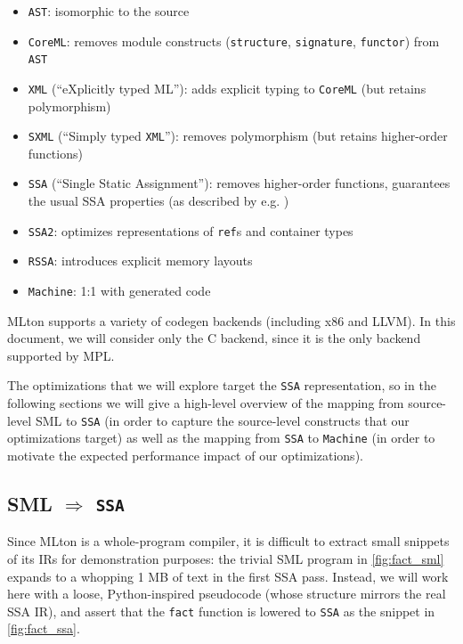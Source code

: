 \begin{itemize}
\item \texttt{AST}: isomorphic to the source
\item \texttt{CoreML}: removes module constructs (\texttt{structure}, \texttt{signature},
  \texttt{functor}) from \texttt{AST}
\item \texttt{XML} (``eXplicitly typed ML''): adds explicit typing to \texttt{CoreML} (but retains
  polymorphism)
\item \texttt{SXML} (``Simply typed \texttt{XML}''): removes polymorphism (but
  retains higher-order functions)
\item \texttt{SSA} (``Single Static Assignment''): removes higher-order functions,
  guarantees the usual SSA properties (as described by e.g. \citet{ssa-paper})
\item \texttt{SSA2}: optimizes representations of \texttt{ref}s and container types
\item \texttt{RSSA}: introduces explicit memory layouts
\item \texttt{Machine}: 1:1 with generated code
\end{itemize}

MLton supports a variety of codegen backends (including x86 and LLVM). In this
document, we will consider only the C backend, since it is the only backend
supported by MPL.

The optimizations that we will explore target the \texttt{SSA} representation,
so in the following sections we will give a high-level overview of the mapping
from source-level SML to \texttt{SSA} (in order to capture the source-level
constructs that our optimizations target) as well as the mapping from
\texttt{SSA} to \texttt{Machine} (in order to motivate the expected performance
impact of our optimizations).

\label{sec:background_sml_ssa}
\subsection{SML \texorpdfstring{$\Rightarrow$}{->} \texttt{SSA}}

Since MLton is a whole-program compiler, it is difficult to extract small
snippets of its IRs for demonstration purposes: the trivial SML program in
\cref{fig:fact_sml} expands to a whopping 1 MB of text in the first SSA pass.
Instead, we will work here with a loose, Python-inspired pseudocode (whose
structure mirrors the real SSA IR), and assert that the \texttt{fact} function is
lowered to \texttt{SSA} as the snippet in \cref{fig:fact_ssa}.

